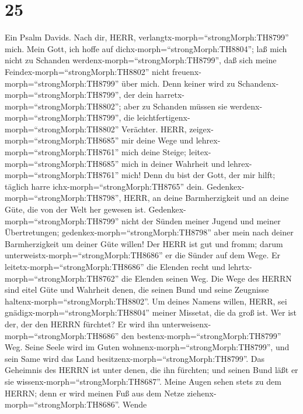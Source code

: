 \hypertarget{section-24}{%
\section{25}\label{section-24}}

 Ein Psalm Davids. Nach dir, HERR,
verlangtx-morph=``strongMorph:TH8799'' mich.  Mein Gott, ich
hoffe auf dichx-morph=``strongMorph:TH8804''; laß mich nicht zu Schanden
werdenx-morph=``strongMorph:TH8799'', daß sich meine
Feindex-morph=``strongMorph:TH8802'' nicht
freuenx-morph=``strongMorph:TH8799'' über mich.  Denn keiner
wird zu Schandenx-morph=``strongMorph:TH8799'', der dein
harretx-morph=``strongMorph:TH8802''; aber zu Schanden müssen sie
werdenx-morph=``strongMorph:TH8799'', die
leichtfertigenx-morph=``strongMorph:TH8802'' Verächter. 
HERR, zeigex-morph=``strongMorph:TH8685'' mir deine Wege und
lehrex-morph=``strongMorph:TH8761'' mich deine Steige; 
leitex-morph=``strongMorph:TH8685'' mich in deiner Wahrheit und
lehrex-morph=``strongMorph:TH8761'' mich! Denn du bist der Gott, der mir
hilft; täglich harre ichx-morph=``strongMorph:TH8765'' dein.
 Gedenkex-morph=``strongMorph:TH8798'', HERR, an deine
Barmherzigkeit und an deine Güte, die von der Welt her gewesen ist.
 Gedenkex-morph=``strongMorph:TH8799'' nicht der Sünden
meiner Jugend und meiner Übertretungen;
gedenkex-morph=``strongMorph:TH8798'' aber mein nach deiner
Barmherzigkeit um deiner Güte willen!  Der HERR ist gut und
fromm; darum unterweistx-morph=``strongMorph:TH8686'' er die Sünder auf
dem Wege.  Er leitetx-morph=``strongMorph:TH8686'' die
Elenden recht und lehrtx-morph=``strongMorph:TH8762'' die Elenden seinen
Weg.  Die Wege des HERRN sind eitel Güte und Wahrheit
denen, die seinen Bund und seine Zeugnisse
haltenx-morph=``strongMorph:TH8802''.  Um deines Namens
willen, HERR, sei gnädigx-morph=``strongMorph:TH8804'' meiner Missetat,
die da groß ist.  Wer ist der, der den HERRN fürchtet? Er
wird ihn unterweisenx-morph=``strongMorph:TH8686'' den
bestenx-morph=``strongMorph:TH8799'' Weg.  Seine Seele wird
im Guten wohnenx-morph=``strongMorph:TH8799'', und sein Same wird das
Land besitzenx-morph=``strongMorph:TH8799''.  Das Geheimnis
des HERRN ist unter denen, die ihn fürchten; und seinen Bund läßt er sie
wissenx-morph=``strongMorph:TH8687''.  Meine Augen sehen
stets zu dem HERRN; denn er wird meinen Fuß aus dem Netze
ziehenx-morph=``strongMorph:TH8686''.  Wende
